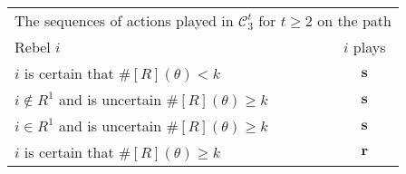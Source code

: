 \documentclass[12pt,letter]{article}
\newcommand{\Kappa}{\mathcal{C}}
\theoremstyle{definition}
\theoremstyle{remark}
\theoremstyle{claim}
\begin{document}
\begin{table}[!htbp]
\begin{center}
\begin{tabular}{l c}
\multicolumn{2}{c}{The sequences of actions played in $\Kappa^t_{3}$ for $t\geq 2$ on the path}\\
Rebel $i$ 	 	&  	$i$ plays		 \\
\hline
\hline
$i$ is certain that $\#[R](\theta)<k$ 	& 	$\textbf{s}$	\\
$i\notin R^{1}$ and is uncertain $\#[R](\theta)\geq k$	& 	$ \textbf{s} $	\\
$i\in R^{1}$ and is uncertain $\#[R](\theta)\geq k$ &  $ \textbf{s} $  \\
$i$ is certain that $\#[R](\theta)\geq k$ &  $ \textbf{r} $  \\
\hline
\end{tabular}
\end{center}
\end{table}


\end{document}
